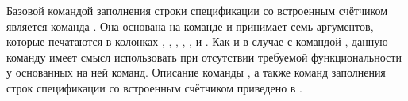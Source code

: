 Базовой командой заполнения строки спецификации со встроенным счётчиком является команда
. Она основана на команде  и
принимает семь аргументов, которые печатаются в колонках
, ,
, ,
,  и
. Как и в случае с командой
, данную команду имеет смысл использовать при отсутствии
требуемой функциональности у основанных на ней команд. Описание команды
, а также команд заполнения строк спецификации со
встроенным счётчиком приведено в .

\clearpage


